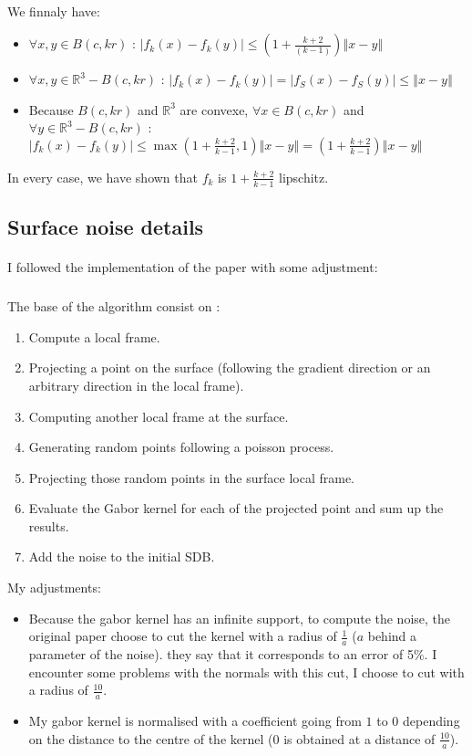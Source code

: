 \documentclass[a4paper,12pt]{article}
\begin{document}
\paragraph{} We finnaly have:
\begin{itemize}
	\item $\forall x, y \in B(c, kr)$ : $\left| f_k(x) - f_k(y) \right| \le (1 + \frac{k+2}{(k-1)})\left\Vert x - y \right\Vert $
	\item $\forall x, y \in \mathbb{R}^3 - B(c, kr)$ : $\left| f_k(x) - f_k(y) \right| = \left| f_S(x) - f_S(y) \right| \le \left\Vert x - y \right\Vert$
	\item Because $B(c, kr)$ and $\mathbb{R}^3$ are convexe, $\forall x \in B(c, kr)$ and $\forall y \in \mathbb{R}^3 - B(c, kr)$ : $\left| f_k(x) - f_k(y) \right| \le \max(1 + \frac{k+2}{k-1}, 1) \left\Vert x - y \right\Vert = (1 + \frac{k+2}{k-1})\left\Vert x - y \right\Vert$
\end{itemize}
In every case, we have shown that $f_k$ is $1 + \frac{k+2}{k-1}$ lipschitz.


\subsection*{Surface noise details}

\paragraph{} I followed the implementation of the paper\cite{zanni2013modelisation} with some adjustment:
\subparagraph{} The base of the algorithm consist on :
\begin{enumerate}
	\item Compute a local frame.
	\item Projecting a point on the surface (following the gradient direction or an arbitrary direction in the local frame).
	\item Computing another local frame at the surface.
	\item Generating random points following a poisson process.
	\item Projecting those random points in the surface local frame.
	\item Evaluate the Gabor kernel for each of the projected point and sum up the results.
	\item Add the noise to the initial SDB.
\end{enumerate}


My adjustments:
\begin{itemize}
	\item Because the gabor kernel has an infinite support, to compute the noise, the original paper\cite{lagae2009procedural} choose to cut the kernel with a radius of $\frac{1}{a}$ ($a$ behind a parameter of the noise). they say that it corresponds to an error of 5\%. I encounter some problems with the normals with this cut, I choose to cut with a radius of $\frac{10}{a}$.
	\item My gabor kernel is normalised with a coefficient going from $1$ to $0$ depending on the distance to the centre of the kernel ($0$ is obtained at a distance of $\frac{10}{a}$).
\end{itemize}




\end{document}
